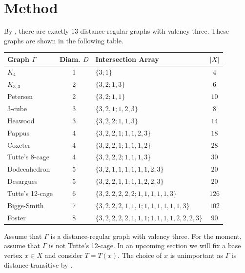 \documentclass[12pt,letterpaper]{article}
\begin{document}
\section{Method}\label{subsec:method}

By \cite[Theorem~7.5.1]{brouwer}, there are exactly 13 distance-regular graphs with valency three. These graphs are shown in the following table.

    \begin{center}
        \begin{tabular}{lclc}
        \toprule
            Graph $\Gamma$ & Diam. $D$ & Intersection Array & $|X|$ \\
            \midrule
            $K_4$  & 1& $\{3;1\}$ & $4$\\
             $K_{3,3}$ & 2& $\{3,2;1,3\}$ &$6$ \\
            Petersen &2& $\{3,2;1,1\}$ & $10$\\
            3-cube &3& $\{3,2,1;1,2,3\}$ & $8$\\
            Heawood &3& $\{3,2,2;1,1,3\}$ & $14$\\
            Pappus &4& $\{3,2,2,1;1,1,2,3\}$ & $18$\\
            Coxeter &4& $\{3,2,2,1;1,1,1,2\}$ & $28$\\
           Tutte's 8-cage  &4& $\{3,2,2,2;1,1,1,3\}$ & $30$\\
            Dodecahedron &5& $\{3,2,1,1,1;1,1,1,2,3\}$ &$20$ \\
           Desargues  &5& $\{3,2,2,1,1;1,1,2,2,3\}$ & $20$\\
            Tutte's 12-cage &6& $\{3,2,2,2,2,2;1,1,1,1,1,3\}$ & $126$\\
           Biggs-Smith  &7& $\{3,2,2,2,1,1,1;1,1,1,1,1,1,3\}$ & $102$ \\
           Foster  &8& $\{3,2,2,2,2,1,1,1;1,1,1,1,2,2,2,3\}$ & $90$ \\
           \bottomrule
      \end{tabular}
    \end{center}


Assume that $\Gamma$ is a distance-regular graph with valency three.
For the moment, assume that $\Gamma$ is not Tutte's 12-cage. In an upcoming section we will fix
a base vertex $x \in X$ and consider $T=T(x)$. The choice of $x$ is unimportant as $\Gamma$ is distance-transitive by \cite[Theorem~7.5.1]{brouwer}. 
\end{document}
